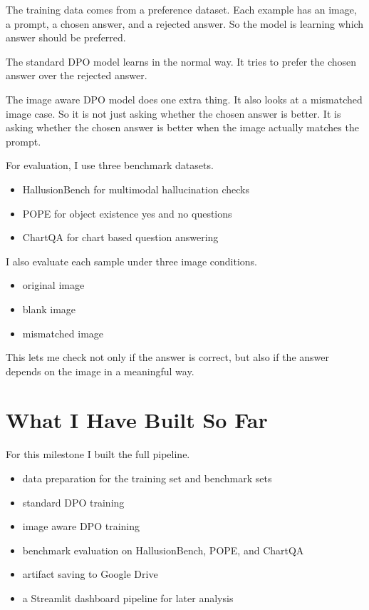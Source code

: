 \documentclass[11pt]{article}
\begin{document}
The training data comes from a preference dataset.
Each example has an image, a prompt, a chosen answer, and a rejected answer.
So the model is learning which answer should be preferred.

The standard DPO model learns in the normal way.
It tries to prefer the chosen answer over the rejected answer.

The image aware DPO model does one extra thing.
It also looks at a mismatched image case.
So it is not just asking whether the chosen answer is better.
It is asking whether the chosen answer is better when the image actually matches the prompt.

For evaluation, I use three benchmark datasets.

\begin{itemize}
    \item HallusionBench for multimodal hallucination checks
    \item POPE for object existence yes and no questions
    \item ChartQA for chart based question answering
\end{itemize}

I also evaluate each sample under three image conditions.

\begin{itemize}
    \item original image
    \item blank image
    \item mismatched image
\end{itemize}

This lets me check not only if the answer is correct, but also if the answer depends on the image in a meaningful way.

\section*{What I Have Built So Far}
For this milestone I built the full pipeline.

\begin{itemize}
    \item data preparation for the training set and benchmark sets
    \item standard DPO training
    \item image aware DPO training
    \item benchmark evaluation on HallusionBench, POPE, and ChartQA
    \item artifact saving to Google Drive
    \item a Streamlit dashboard pipeline for later analysis
\end{itemize}
\end{document}
